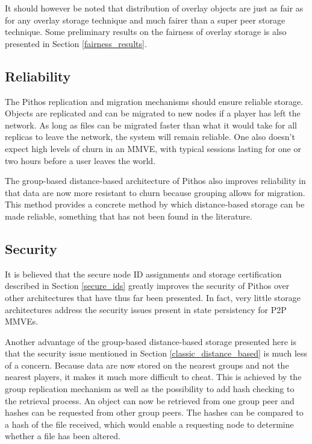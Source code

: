 \documentclass[10pt,a4paper,conference]{IEEEtran}
\begin{document}
It should however be noted that distribution of overlay objects are just as fair as for any overlay storage technique and much fairer than a super
peer storage technique. Some preliminary results on the fairness of overlay storage is also presented in Section \ref{fairness_results}.

\subsection{Reliability}

The Pithos replication and migration mechanisms should ensure reliable storage. Objects are replicated and can be migrated to new nodes if a player
has left the network. As long as files can be migrated faster than what it would take for all replicas to leave the network, the system will remain
reliable. One also doesn't expect high levels of churn in an MMVE, with typical sessions lasting for one or two hours before a user leaves the world.

The group-based distance-based architecture of Pithos also improves reliability in that data are now more resistant to churn because grouping allows
for migration. This method provides a concrete method by which distance-based storage can be made reliable, something that has not been found in the
literature.

\subsection{Security}

It is believed that the secure node ID assignments and storage certification described in Section \ref{secure_ids} greatly improves the security of
Pithos over other architectures that have thus far been presented. In fact, very little storage architectures address the security issues present in
state persistency for P2P MMVEs.

Another advantage of the group-based distance-based storage presented here is that the security issue mentioned in Section
\ref{classic_distance_based} is much less of a concern. Because data are now stored on the nearest groups and not the nearest players, it makes it
much more difficult to cheat. This is achieved by the group replication mechanism as well as the possibility to add hash checking to the retrieval
process. An object can now be retrieved from one group peer and hashes can be requested from other group peers. The hashes can be compared to a hash
of the file received, which would enable a requesting node to determine whether a file has been altered.
\end{document}
